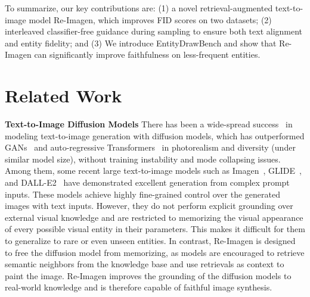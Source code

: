 \documentclass{article} \usepackage{iclr2023_conference,times}
\newcommand{\modelname}{{Re-Imagen}\xspace}
\begin{document}
To summarize, our key contributions are:  {(1)} a novel retrieval-augmented text-to-image model \modelname, which improves FID scores on two datasets; {(2)} interleaved classifier-free guidance during sampling to ensure both text alignment and entity fidelity; and  {(3)} We introduce EntityDrawBench and show that \modelname can significantly improve faithfulness on less-frequent entities.

\section{Related Work}

\noindent \textbf{Text-to-Image Diffusion Models} There has been a wide-spread success~\citep{ashual2022knn,ramesh2022hierarchical,saharia2022photorealistic,nichol2021glide} in modeling text-to-image generation with diffusion models, which has outperformed GANs~\citep{goodfellow2014generative} and auto-regressive Transformers~\citep{ramesh2021zero} in photorealism and diversity (under similar model size), without training instability and mode collapsing issues. Among them, some recent large text-to-image models such as Imagen~\citep{saharia2022photorealistic}, GLIDE~\citep{nichol2021glide}, and DALL-E2~\citep{ramesh2022hierarchical} have demonstrated excellent generation from complex prompt inputs. These models achieve highly fine-grained control over the generated images with text inputs. However, they do not perform explicit grounding over external visual knowledge and are restricted to memorizing the visual appearance of every possible visual entity in their parameters. This makes it difficult for them to generalize to rare or even unseen entities. In contrast, \modelname is designed to free the diffusion model from memorizing, as models are encouraged to retrieve semantic neighbors from the knowledge base and use retrievals as context to paint the image. \modelname improves the grounding of the diffusion models to real-world knowledge and is therefore capable of faithful image synthesis. \vspace{1ex} \\
\end{document}

